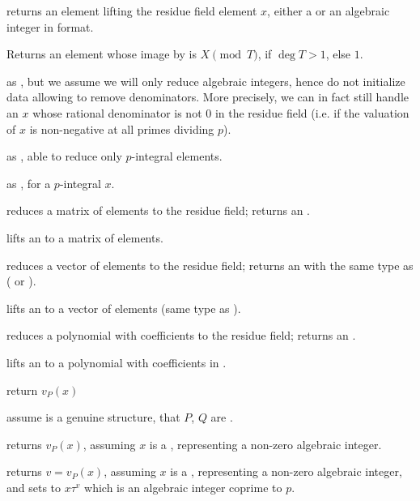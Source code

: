  returns an  element lifting
the residue field element $x$, either a  or an algebraic integer
in  format.

 Returns an  element whose image by
 is $X \pmod T$, if $\deg T>1$, else $1$.

 as , but we assume we
will only reduce algebraic integers, hence do not initialize data allowing to
remove denominators. More precisely, we can in fact still handle an $x$ whose
rational denominator is not $0$ in the residue field (i.e. if the valuation
of $x$ is non-negative at all primes dividing $p$).

 as
, able to reduce only $p$-integral elements.

 as , for
a $p$-integral $x$.

 reduces a matrix
of  elements to the residue field; returns an .

 lifts an  to a matrix of
 elements.

 reduces a vector
of  elements to the residue field; returns an 
with the same type as  ( or ).

 lifts an  to a vector of
 elements (same type as ).

 reduces a polynomial
with  coefficients to the residue field; returns an .

 lifts an  to a polynomial
with coefficients in .


 return $v_P(x)$

 assume  is a genuine 
structure, that $P$, $Q$ are .

 returns $v_P(x)$,
assuming $x$ is a , representing a non-zero algebraic integer.

 returns $v = v_P(x)$,
assuming $x$ is a , representing a non-zero algebraic integer, and sets
 to $x\tau^v$ which is an algebraic integer coprime to $p$.

